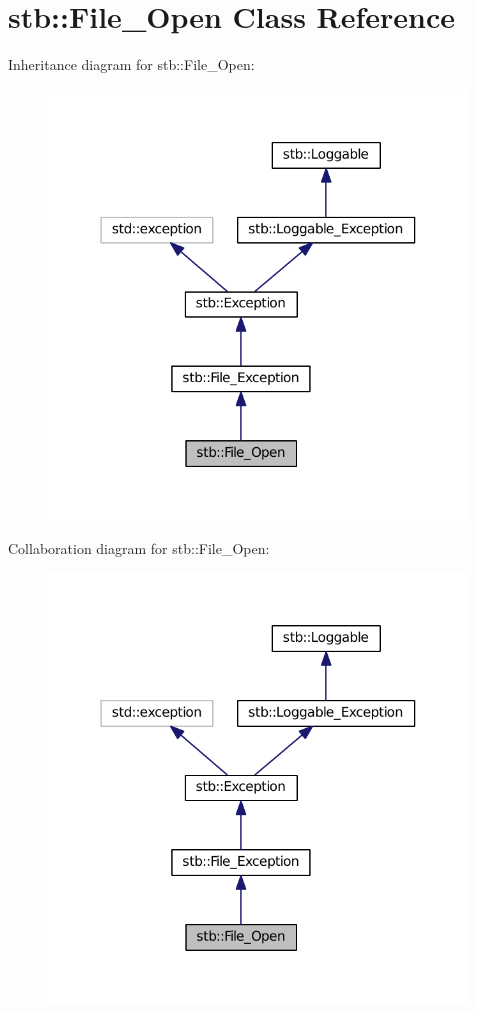 \hypertarget{classstb_1_1File__Open}{\section{stb\+:\+:File\+\_\+\+Open Class Reference}
\label{classstb_1_1File__Open}
}


Inheritance diagram for stb\+:\+:File\+\_\+\+Open\+:
\nopagebreak
\begin{figure}[H]
\begin{center}
\leavevmode
\includegraphics[width=316pt]{classstb_1_1File__Open__inherit__graph}
\end{center}
\end{figure}


Collaboration diagram for stb\+:\+:File\+\_\+\+Open\+:
\nopagebreak
\begin{figure}[H]
\begin{center}
\leavevmode
\includegraphics[width=316pt]{classstb_1_1File__Open__coll__graph}
\end{center}
\end{figure}
